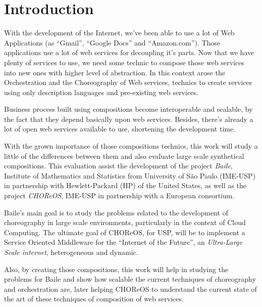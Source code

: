 \section{Introduction}

With the development of the Internet, we've been able to use a lot of Web Applications (as ``Gmail'', ``Google Docs'' and ``Amazon.com''). Those applications use a lot of web services for decoupling it's parts. Now that we have plenty of services to use, we need some technic to compose those web services into new ones with higher level of abstraction. In this context arose the Orchestration and the Choreography of Web services, technics to create services using only description languages and pre-existing web services.

Business process built using compositions become interoperable and scalable, by the fact that they depend basically upon web services. Besides, there's already a lot of open web services available to use, shortening the development time.

With the grown importance of those compositions technics, this work will study a little of the differences between them and also evaluate large scale synthetical compositions. This evaluation assist the development of the project \emph{Baile}, Institute of Mathematics and Statistics from University of São Paulo (IME-USP) in partnership with Hewlett-Packard (HP) of the United States, as well as the project \emph{CHOReOS}, IME-USP in partnership with a European consortium.

Baile’s main goal is to study the problems related to the development of choreography in large scale environments, particularly in the context of Cloud Computing. The ultimate goal of CHOReOS, for USP, will be to implement a Service Oriented Middleware for the ``Internet of the Future'', an \emph{Ultra-Large Scale internet}, heterogeneous and dynamic.

Also, by creating those compositions, this work will help in studying the problems for Baile and show how scalable the current techniques of choreography and orchestration are, later helping CHOReOS to understand the current state of the art of these techniques of composition of web services.